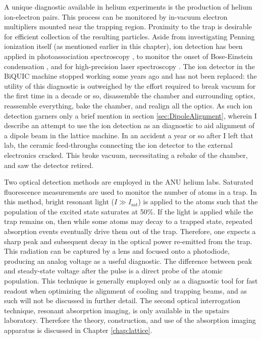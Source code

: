 	A unique diagnostic available in helium experiments is the production of helium ion-electron pairs. This process can be monitored by in-vacuum electron multipliers mounted near the trapping region. Proximity to the trap is desirable for efficient collection of the resulting particles. Aside from investigating Penning ionization itself (as mentioned earlier in this chapter), ion detection has been applied in photoassociation spectroscopy \cite{herschbach00,koelemeij04}, to monitor the onset of Bose-Einstein condensation \cite{tychkov06}, and for high-precision laser spectroscopy \cite{Rengelink18}. The ion detector in the BiQUIC machine stopped working some years ago and has not been replaced: the utility of this diagnostic is outweighed by the effort required to break vacuum for the first time in a decade or so, disassemble the chamber and surrounding optics, reassemble everything, bake the chamber, and realign all the optics. As such ion detection garners only a brief mention in section \ref{sec:DipoleAlignment}, wherein I describe an attempt to use the ion detection as an diagnostic to aid alignment of a dipole beam in the lattice machine. In an accident a year or so after I left that lab, the ceramic feed-throughs connecting the ion detector to the external electronics cracked. This broke vacuum, necessitating a rebake of the chamber, and saw the detector retired. 

	Two optical detection methods are employed in the ANU helium labs. Saturated fluorescence measurements are used to monitor the number of atoms in a trap. In this method, bright resonant light ($I\gg I_\textrm{sat}$) is applied to the atoms such that the population of the excited state saturates at 50\%. If the light is applied while the trap remains on, then while some atoms may decay to a trapped state, repeated absorption events eventually drive them out of the trap. Therefore, one expects a sharp peak and subsequent decay in the optical power re-emitted from the trap. This radiation can be captured by a lens and focused onto a photodiode, producing an analog voltage as a useful diagnostic. The difference between peak and steady-state voltage after the pulse is a direct probe of the atomic population. This technique is generally employed only as a diagnostic tool for fast readout when optimizing the alignment of cooling and trapping beams, and as such will not be discussed in further detail. The second optical interrogation technique, resonant absorprtion imaging, is only available in the upstairs laboratory. Therefore the theory, construction, and use of the absorption imaging apparatus is discussed in Chapter \ref{chap:lattice}. 


